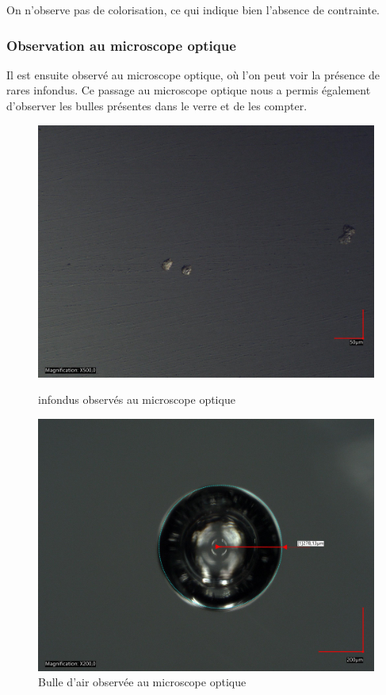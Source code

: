 \documentclass{article}
\begin{document}
On n'observe pas de colorisation, ce qui indique bien l'absence de contrainte.

\subsubsection{Observation au microscope optique}

Il est ensuite observé au microscope optique, où l'on peut voir la présence de rares infondus. Ce passage au microscope optique nous a permis également d'observer les bulles présentes dans le verre et de les compter.

\begin{figure}[h!]
    \centering
    \begin{minipage}{0.45\textwidth}
        \centering
        \includegraphics[width=\textwidth]{photos/impuetée2.jpg}
        \caption{infondus observés au microscope optique}
    \end{minipage}
    \hspace{0.5cm}
    \begin{minipage}{0.45\textwidth}
        \centering
        \includegraphics[width=\textwidth]{photos/rayon 1.jpg}
        \caption{Bulle d'air observée au microscope optique}
    \end{minipage}
\end{figure}
\end{document}
